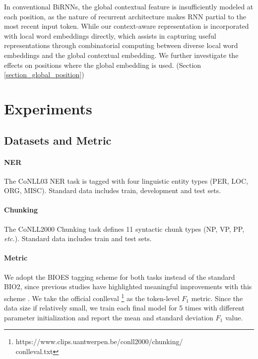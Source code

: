 \documentclass[11pt,a4paper]{article}
\begin{document}
In conventional BiRNNs, the global contextual feature is insufficiently modeled at each position, as the nature of recurrent architecture makes RNN partial to the most recent input token. While our context-aware representation is incorporated with local word embeddings directly, which assists in capturing useful representations through combinatorial computing between diverse local word embeddings and the global contextual embedding. We further investigate the effects on positions where the global embedding is used. (Section \ref{section_global_position})

\section{Experiments}

\subsection{Datasets and Metric}

\paragraph{NER}
The CoNLL03 NER task \cite{CoNLL2003} is tagged with four linguistic entity types (PER, LOC, ORG, MISC). Standard data includes train, development and test sets. 

\paragraph{Chunking}
The CoNLL2000 Chunking task \cite{CoNLL2000} defines 11 syntactic chunk types (NP, VP, PP, {\em etc.}). Standard data includes train and test sets.

\paragraph{Metric}
We adopt the BIOES tagging scheme for both tasks instead of the standard BIO2, since previous studies have highlighted meaningful improvements with this scheme \cite{BIES}. We take the official conlleval \footnote{https://www.clips.uantwerpen.be/conll2000/chunking/\\conlleval.txt} as the token-level $F_1$  metric. Since the data size if relatively small, we train each final model for 5 times with different parameter initialization and report the mean and standard deviation $F_1$ value. 
\end{document}
